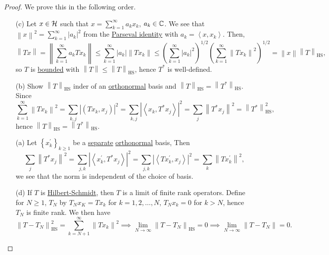 \begin{proof}
	We prove this in the following order.
	\begin{enumerate}
		\item[(c)] Let \(x\in \mathcal{\MakeUppercase{h}} \) such that \(x = \sum_{k=1}^{\infty} a_{k} x_{k} \), \(a_{k} \in \mathbb{\MakeUppercase{c}} \). We see that \(\left\lVert x\right\rVert ^{2} = \sum_{k=1}^{\infty}\left\vert a_{k}  \right\vert ^{2} \) from the \hyperref[col:Parseval]{Parseval identity} with \(a_{k} = \left\langle x, x_{k}  \right\rangle \). Then,
			\[
				\left\lVert Tx\right\rVert
				= \left\lVert \sum_{k=1}^{\infty} a_{k} Tx_{k} \right\rVert
				\leq \sum_{k=1}^{\infty} \left\vert a_{k}  \right\vert \left\lVert T x_{k} \right\rVert
				\leq \left( \sum_{k=1}^{\infty} \left\vert a_{k} \right\vert ^2 \right) ^{1 / 2} \left( \sum_{k=1}^{\infty} \left\lVert T x_{k} \right\rVert ^{2} \right) ^{1 / 2}
				= \left\lVert x\right\rVert \left\lVert T\right\rVert _{\mathrm{HS}},
			\]
			so \(T\) is \hyperref[def:bounded-linear-op]{bounded} with \(\left\lVert T\right\rVert \leq \left\lVert T\right\rVert _{\mathrm{HS} }\), hence \(T^{\ast} \) is well-defined.
		\item[(b)] Show \(\left\lVert T\right\rVert _{\mathrm{HS} }\) inder of an \hyperref[def:orthonormal-system]{orthonormal} basis and \(\left\lVert T\right\rVert _{\mathrm{HS} }= \left\lVert T^{\ast} \right\rVert_{\mathrm{HS} } \). Since
			\[
				\sum_{k=1}^{\infty} \left\lVert Tx_{k} \right\rVert ^{2}
				= \sum_{k, j} \left\vert \left( T x_{k} , x_{j}  \right)  \right\vert ^{2}
				= \sum_{k, j} \left\vert \left\langle x_{k} , T^{\ast} x_{j}  \right\rangle  \right\vert ^{2}
				= \sum_{j} \left\lVert T^{\ast} x_{j} \right\rVert ^{2}
				= \left\lVert T^{\ast} \right\rVert ^{2} _{\mathrm{HS} },
			\]
			hence \(\left\lVert T\right\rVert _{\mathrm{HS} } = \left\lVert T^{\ast} \right\rVert _{\mathrm{HS} }\).
		\item[(a)] Let \(\left\{ x^\prime _k \right\}_{k\geq 1} \) be a \hyperref[def:separable]{separate} \hyperref[def:orthonormal-system]{orthonormal} basis, Then
			\[
				\sum_{j} \left\lVert T^{\ast} x_{j} \right\rVert ^{2}
				= \sum_{j, k} \left\vert \left\langle x^\prime _{k} , T^{\ast} x_{j}  \right\rangle  \right\vert ^{2}
				= \sum_{j, k} \left\vert \left\langle T x^\prime _{k} , x_{j}  \right\rangle  \right\vert ^{2}
				= \sum_{k} \left\lVert T x^\prime _{k} \right\rVert ^{2},
			\]
			we see that the norm is independent of the choice of basis.
		\item[(d)] If \(T\) is \hyperref[def:Hilbert-Schmidt-op]{Hilbert-Schmidt}, then \(T\) is a limit of finite rank operators. Define for \(N \geq 1\), \(T_N\) by \(T_N x_K = Tx_k\) for \(k = 1, 2, \ldots  , N\), \(T_{N}x_k = 0 \) for \(k > N\), hence \(T_N\) is finite rank. We then have
			\[
				\left\lVert T - T_{N} \right\rVert ^{2} _{\mathrm{HS} }= \sum_{k=N+1}^{\infty} \left\lVert T x_{k} \right\rVert ^{2}
				\implies \lim_{N \to \infty} \left\lVert T - T_{N} \right\rVert _{\mathrm{HS} }= 0
				\implies \lim_{N \to \infty} \left\lVert T - T_N\right\rVert = 0.
			\]
	\end{enumerate}
\end{proof}

